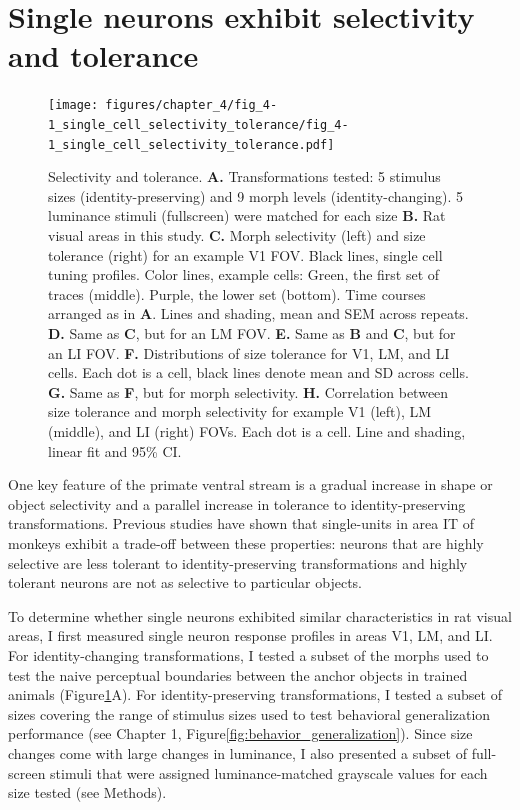 \section{Single neurons exhibit selectivity and tolerance}
\begin{figure}[t!]
    \texttt{[image: figures/chapter\_4/fig\_4-1\_single\_cell\_selectivity\_tolerance/fig\_4-1\_single\_cell\_selectivity\_tolerance.pdf]}
    \caption[Single neuron selectivity and tolerance]{Selectivity and tolerance. 
    \textbf{A.} Transformations tested: 5 stimulus sizes (identity-preserving) and 9 morph levels (identity-changing). 5 luminance stimuli (fullscreen) were matched for each size
    \textbf{B.} Rat visual areas in this study. 
    \textbf{C.} Morph selectivity (left) and size tolerance (right) for an example V1 FOV. Black lines, single cell tuning profiles. Color lines, example cells: Green, the first set of traces (middle). Purple, the lower set (bottom). Time courses arranged as in \textbf{A}. Lines and shading, mean and SEM across repeats.
    \textbf{D.} Same as \textbf{C}, but for an LM FOV.
    \textbf{E.} Same as \textbf{B} and \textbf{C}, but for an LI FOV.
    \textbf{F.} Distributions of size tolerance for V1, LM, and LI cells. Each dot is a cell, black lines denote mean and SD across cells.
    \textbf{G.} Same as \textbf{F}, but for morph selectivity. 
    \textbf{H.} Correlation between size tolerance and morph selectivity for example V1 (left), LM (middle), and LI (right) FOVs. Each dot is a cell. Line and shading, linear fit and 95\% CI.
    \label{fig:selectivity_tolerance}}
\end{figure}

One key feature of the primate ventral stream is a gradual increase in shape or object selectivity and a parallel increase in tolerance to identity-preserving transformations. Previous studies have shown that single-units in area IT of monkeys exhibit a trade-off between these properties: neurons that are highly selective are less tolerant to identity-preserving transformations and highly tolerant neurons are not as selective to particular objects\cite{Zoccolan2007}.

To determine whether single neurons exhibited similar characteristics in rat visual areas, I first measured single neuron response profiles in areas V1, LM, and LI. For identity-changing transformations, I tested a subset of the morphs used to test the naive perceptual boundaries between the anchor objects in trained animals (Figure\ref{fig:selectivity_tolerance}A). For identity-preserving transformations, I tested a subset of sizes covering the range of stimulus sizes used to test behavioral generalization performance (see Chapter 1, Figure\ref{fig:behavior_generalization}). Since size changes come with large changes in luminance, I also presented a subset of full-screen stimuli that were assigned luminance-matched grayscale values for each size tested (see Methods).

